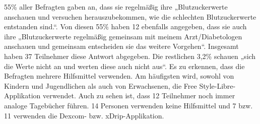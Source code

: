 \documentclass[a4paper,11pt]{article}%
\renewcommand{\\}{\vspace*{0.5\baselineskip} \newline}
\begin{document}
	55\% aller Befragten gaben an, dass sie regelmäßig ihre „Blutzuckerwerte anschauen und versuchen herauszubekommen, wie die schlechten Blutzuckerwerte entstanden sind.“. Von diesen 55\% haben 12 ebenfalls angegeben, dass sie auch ihre „Blutzuckerwerte regelmäßig gemeinsam mit meinem Arzt/Diabetologen anschauen und gemeinsam entscheiden sie das weitere Vorgehen“. Insgesamt haben 37 Teilnehmer diese Antwort abgegeben. Die restlichen 3,2\% schauen „sich die Werte nicht an und werten diese auch nicht aus“. \newline
	Es zu erkennen, dass die Befragten mehrere Hilfsmittel verwenden. Am häufigsten wird, sowohl von Kindern und Jugendlichen als auch von Erwachsenen, die Free Style-Libre-Applikation verwendet. Auch zu sehen ist, dass 12 Teilnehmer noch immer analoge Tagebücher führen. 14 Personen verwenden keine Hilfsmittel und 7 bzw. 11 verwenden die Dexcom- bzw. xDrip-Applikation.
\end{document}
